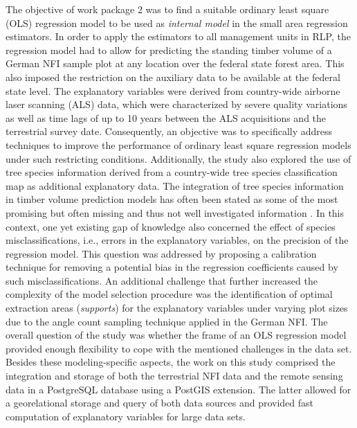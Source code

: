 The objective of work package 2 was to find a suitable ordinary least square (OLS) regression model to be used as \textit{internal model} in the small area regression estimators. In order to apply the estimators to all management units in RLP, the regression model had to allow for predicting the standing timber volume of a German NFI sample plot at any location over the federal state forest area. This also imposed the restriction on the auxiliary data to be available at the federal state level. The explanatory variables were derived from country-wide airborne laser scanning (ALS) data, which were characterized by severe quality variations as well as time lags of up to 10 years between the ALS acquisitions and the terrestrial survey date. Consequently, an objective was to specifically address techniques to improve the performance of ordinary least square regression models under such restricting conditions. Additionally, the study also explored the use of tree species information derived from a country-wide tree species classification map as additional explanatory data. The integration of tree species information in timber volume prediction models has often been stated as some of the most promising but often missing and thus not well investigated information \citep{koch2010, white2016}. In this context, one yet existing gap of knowledge also concerned the effect of species misclassifications, i.e., errors in the explanatory variables, on the precision of the regression model. This question was addressed by proposing a calibration technique for removing a potential bias in the regression coefficients caused by such misclassifications. An additional challenge that further increased the complexity of the model selection procedure was the identification of optimal extraction areas (\textit{supports}) for the explanatory variables under varying plot sizes due to the angle count sampling technique applied in the German NFI. The overall question of the study was whether the frame of an OLS regression model provided enough flexibility to cope with the mentioned challenges in the data set. Besides these modeling-specific aspects, the work on this study comprised the integration and storage of both the terrestrial NFI data and the remote sensing data in a PostgreSQL database using a PostGIS extension. The latter allowed for a georelational storage and query of both data sources and provided fast computation of explanatory variables for large data sets.


